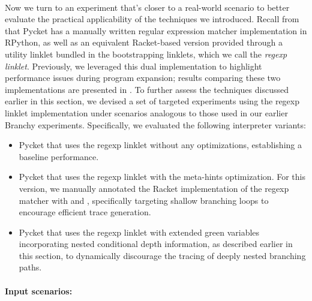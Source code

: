     \paragraph{}%
      Now we turn to an experiment that's closer to a real-world scenario to better evaluate the practical applicability of the techniques we introduced. Recall from  that Pycket has a manually written regular expression matcher implementation in RPython, as well as an equivalent Racket-based version provided through a utility linklet bundled in the bootstrapping linklets, which we call the \emph{regexp linklet}. Previously, we leveraged this dual implementation to highlight performance issues during program expansion; results comparing these two implementations are presented in . To further assess the techniques discussed earlier in this section, we devised a set of targeted experiments using the regexp linklet implementation under scenarios analogous to those used in our earlier Branchy experiments. Specifically, we evaluated the following interpreter variants:

    \begin{itemize}
      \item Pycket that uses the regexp linklet without any optimizations, establishing a baseline performance.
      \item Pycket that uses the regexp linklet with the meta-hints optimization. For this version, we manually annotated the Racket implementation of the regexp matcher with  and , specifically targeting shallow branching loops to encourage efficient trace generation.
      \item Pycket that uses the regexp linklet with extended green variables incorporating nested conditional depth information, as described earlier in this section, to dynamically discourage the tracing of deeply nested branching paths.
    \end{itemize}

    \paragraph{Input scenarios:}

